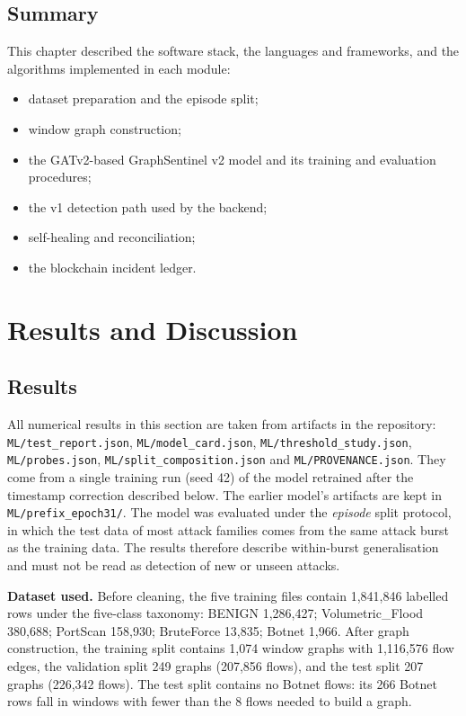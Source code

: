 \documentclass[12pt,a4paper]{report}
\begin{document}
\section{Summary}
This chapter described the software stack, the languages and frameworks, and the algorithms implemented in each module:
\begin{itemize}
    \item dataset preparation and the episode split;
    \item window graph construction;
    \item the GATv2-based GraphSentinel v2 model and its training and evaluation procedures;
    \item the v1 detection path used by the backend;
    \item self-healing and reconciliation;
    \item the blockchain incident ledger.
\end{itemize}


\chapter{Results and Discussion}
\section{Results}
\par All numerical results in this section are taken from artifacts in the repository: \texttt{ML/test\_report.json}, \texttt{ML/model\_card.json}, \texttt{ML/threshold\_study.json}, \texttt{ML/probes.json}, \texttt{ML/split\_composition.json} and \texttt{ML/PROVENANCE.json}. They come from a single training run (seed 42) of the model retrained after the timestamp correction described below. The earlier model's artifacts are kept in \texttt{ML/prefix\_epoch31/}. The model was evaluated under the \emph{episode} split protocol, in which the test data of most attack families comes from the same attack burst as the training data. The results therefore describe within-burst generalisation and must not be read as detection of new or unseen attacks.

\par\textbf{Dataset used.} Before cleaning, the five training files contain 1{,}841{,}846 labelled rows under the five-class taxonomy: BENIGN 1{,}286{,}427; Volumetric\_Flood 380{,}688; PortScan 158{,}930; BruteForce 13{,}835; Botnet 1{,}966. After graph construction, the training split contains 1{,}074 window graphs with 1{,}116{,}576 flow edges, the validation split 249 graphs (207{,}856 flows), and the test split 207 graphs (226{,}342 flows). The test split contains no Botnet flows: its 266 Botnet rows fall in windows with fewer than the 8 flows needed to build a graph.
\end{document}
